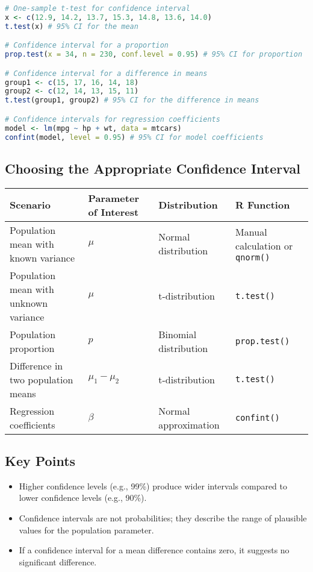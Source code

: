 \begin{lstlisting}[language=R, caption=Confidence Interval Calculations in R]
# One-sample t-test for confidence interval
x <- c(12.9, 14.2, 13.7, 15.3, 14.8, 13.6, 14.0)
t.test(x) # 95% CI for the mean

# Confidence interval for a proportion
prop.test(x = 34, n = 230, conf.level = 0.95) # 95% CI for proportion

# Confidence interval for a difference in means
group1 <- c(15, 17, 16, 14, 18)
group2 <- c(12, 14, 13, 15, 11)
t.test(group1, group2) # 95% CI for the difference in means

# Confidence intervals for regression coefficients
model <- lm(mpg ~ hp + wt, data = mtcars)
confint(model, level = 0.95) # 95% CI for model coefficients
\end{lstlisting}


\subsection{Choosing the Appropriate Confidence Interval}
\begin{tabularx}{\textwidth}{|l|Y|X|X|}
\hline
\textbf{Scenario} & \textbf{Parameter of Interest} & \textbf{Distribution} & \textbf{R Function} \\
\hline
Population mean with known variance & \(\mu\) & Normal distribution & Manual calculation or \texttt{qnorm()} \\
\hline
Population mean with unknown variance & \(\mu\) & t-distribution & \texttt{t.test()} \\
\hline
Population proportion & \(p\) & Binomial distribution & \texttt{prop.test()} \\
\hline
Difference in two population means & \(\mu_1 - \mu_2\) & t-distribution & \texttt{t.test()} \\
\hline
Regression coefficients & \(\beta\) & Normal approximation & \texttt{confint()} \\
\hline
\end{tabularx}

\subsection{Key Points}
\begin{itemize}
    \item Higher confidence levels (e.g., 99\%) produce wider intervals compared to lower confidence levels (e.g., 90\%).
    \item Confidence intervals are not probabilities; they describe the range of plausible values for the population parameter.
    \item If a confidence interval for a mean difference contains zero, it suggests no significant difference.
\end{itemize}
